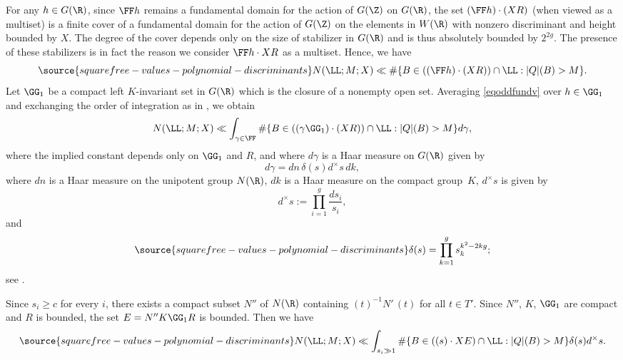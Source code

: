 For any $h\in G(\R)$, since $\FF h$ remains a fundamental domain for
the action of $G(\Z)$ on $G(\R)$, the set $(\FF h)\cdot (XR)$ (when
viewed as a multiset) is a finite cover of a fundamental domain for
the action of $G(\Z)$ on the elements in $W(\R)$ with nonzero
discriminant and height bounded by $X$. The degree of the cover
depends only on the size of stabilizer in $G(\R)$ and is thus
absolutely bounded by $2^{2g}$. The presence of these stabilizers is
in fact the reason we consider $\FF h\cdot XR$ as a multiset. Hence,
we have
\begin{equation}\label{eqoddfundv}
\source{squarefree-values-polynomial-discriminants}
  N(\LL;M;X)\ll \#\{B\in ((\FF h)\cdot (XR))\cap\LL:|Q|(B)>M\}.
\end{equation}
Let $\GG_1$ be a compact left $K$-invariant set in $G(\R)$ which is the
closure of a nonempty open set.
Averaging \eqref{eqoddfundv} over $h\in \GG_1$ and exchanging the
order of integration as in \cite[\S10.1]{BG2}, we obtain
\begin{equation}
  N(\LL;M;X)\ll \int_{\gamma\in\FF} \#\{B\in((\gamma \GG_1)\cdot (XR))\cap\LL:|Q|(B)>M\}
  d\gamma,
\end{equation}
where the implied constant depends only on $\GG_1$ and $R$, and where $d\gamma$ is a Haar measure on $G(\R)$ given by
$$
d\gamma=dn\,\delta(s)d^\times s\,dk,
$$ where $dn$ is a Haar measure on the unipotent group $N(\R)$,
$dk$ is a Haar measure on the compact group~$K$, $d^\times s$ is
given by
$$
d^\times s:=\prod_{i=1}^g\frac{ds_i}{s_i},
$$
and
\begin{equation}\label{eqhaarodd}
\source{squarefree-values-polynomial-discriminants}
\delta(s)=\prod_{k=1}^g s_k^{k^2-2kg};
\end{equation}
see \cite[(10.7)]{BG2}.

Since $s_i\geq c$ for every $i$, there exists a compact subset $N''$
of $N(\R)$ containing $(t)^{-1}N'\,(t)$ for all $t\in T'$. Since
$N''$, $K$, $\GG_1$ are compact and $R$ is bounded, the set $E=N''K\GG_1R$
is bounded. Then we have
\begin{equation}\label{eq:RE}
\source{squarefree-values-polynomial-discriminants}
N(\LL;M;X)\ll \int_{s_i\gg 1} \#\{B\in((s)\cdot XE)\cap\LL:|Q|(B)>M\}\delta(s)d^\times s.
\end{equation}




